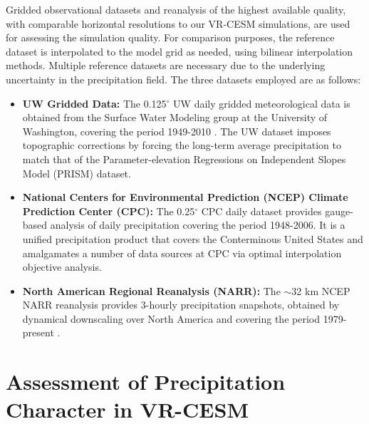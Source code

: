 \documentclass{ametsoc}
\begin{document}
Gridded observational datasets and reanalysis of the highest available quality, with comparable horizontal resolutions to our VR-CESM simulations, are used for assessing the simulation quality. For comparison purposes, the reference dataset is interpolated to the model grid as needed, using bilinear interpolation methods. Multiple reference datasets are necessary due to the underlying uncertainty in the precipitation field. The three datasets employed are as follows:

\begin{itemize}
\item[] \textbf{UW Gridded Data:}  The 0.125$^\circ$ UW daily gridded meteorological data is obtained from the Surface Water Modeling group at the University of Washington, covering the period 1949-2010 \citep{maurer2002long, hamlet2005production}. The UW dataset imposes topographic corrections by forcing the long-term average precipitation to match that of the Parameter-elevation Regressions on Independent Slopes Model (PRISM) dataset.

\item[] \textbf{National Centers for Environmental Prediction (NCEP) Climate Prediction Center (CPC):}  The 0.25$^\circ$ CPC daily dataset provides gauge-based analysis of daily precipitation covering the period 1948-2006. It is a unified precipitation product that covers the Conterminous United States and amalgamates a number of data sources at CPC via optimal interpolation objective analysis.

\item[] \textbf{North American Regional Reanalysis (NARR):}  The $\sim$32 km NCEP NARR reanalysis provides 3-hourly precipitation snapshots, obtained by dynamical downscaling over North America and covering the period 1979-present \citep{mesinger2006north}.
\end{itemize}



\section{Assessment of Precipitation Character in VR-CESM} \label{sec:ModelAssessment}
\end{document}
